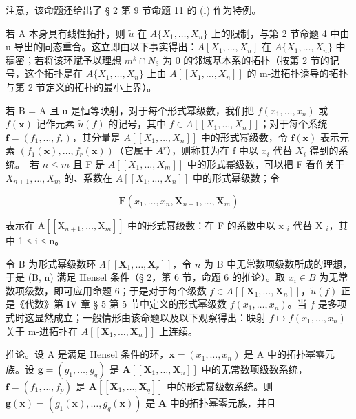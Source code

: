 注意，该命题还给出了 § 2 第 9 节命题 11 的 (i) 作为特例。

若 A 本身具有线性拓扑，则 \(\tilde{u}\) 在 \(A\{X_{1},\ldots,X_{n}\}\) 上的限制，与第 2 节命题 4 中由 u 导出的同态重合。这立即由以下事实得出：\(A[X_{1},\ldots,X_{n}]\) 在 \(A\{X_{1},\ldots,X_{n}\}\) 中稠密；若将该环赋予以理想 \(m^{k}\cap N_{3}\) 为 0 的邻域基本系的拓扑（按第 2 节的记号，这个拓扑是在 \(A\{X_{1},\ldots,X_{n}\}\) 上由 \(A[[X_{1},\ldots,X_{n}]]\) 的 m-进拓扑诱导的拓扑与第 2 节定义的拓扑的最小上界）。

若 B = A 且 u 是恒等映射，对于每个形式幂级数，我们把 \(f(x_{1}, \ldots, x_{n})\) 或 \(f(\mathbf{x})\) 记作元素 \(\tilde{u}(f)\) 的记号，其中 \(f \in A[[X_{1}, \ldots, X_{n}]]\)；对于每个系统 \(\mathbf{f} = (f_{1}, \ldots, f_{r})\)，其分量是 \(A[[X_{1}, \ldots, X_{n}]]\) 中的形式幂级数，令 \(\mathbf{f}(\mathbf{x})\) 表示元素 \((f_{1}(\mathbf{x}), \ldots, f_{r}(\mathbf{x}))\)（它属于 \(A^{r}\)），则称其为在 f 中以 \(x_{i}\) 代替 \(X_{i}\) 得到的系统。~若 \(n \leqslant m\) 且 F 是 \(A[[X_{1}, \ldots, X_{m}]]\) 中的形式幂级数，可以把 F 看作关于 \(X_{n+1}, \ldots, X_{m}\) 的、系数在 \(A[[X_{1}, \ldots, X_{n}]]\) 中的形式幂级数；令

\[
\mathbf {F} (x _ {1}, \dots , x _ {n}, \mathbf {X} _ {n + 1}, \dots , \mathbf {X} _ {m})
\]

表示在 \(\mathrm{A}[[\mathrm{X}_{n+1}, \ldots, \mathrm{X}_{m}]]\) 中的形式幂级数：在 F 的系数中以 x \(_{i}\) 代替 X \(_{i}\)，其中 1 ≤ i ≤ n。

令 B 为形式幂级数环 \(\Lambda[[\mathbf{X}_1,\ldots,\mathbf{X}_r]]\)，令 \(n\) 为 B 中无常数项级数所成的理想，于是 (B, n) 满足 Hensel 条件（§ 2，第 6 节，命题 6 的推论）。取 \(x_i \in B\) 为无常数项级数，即可应用命题 6；于是对于每个级数 \(f \in A[[\mathbf{X}_1,\ldots,\mathbf{X}_n]]\)，\(\tilde{u}(f)\) 正是《代数》第 IV 章 § 5 第 5 节中定义的形式幂级数 \(f(x_1,\ldots,x_n)\)。当 \(f\) 是多项式时这显然成立；一般情形由该命题以及以下观察得出：映射 \(f \mapsto f(x_1,\ldots,x_n)\) 关于 m-进拓扑在 \(A[[\mathbf{X}_1,\ldots,\mathbf{X}_n]]\) 上连续。

推论。设 A 是满足 Hensel 条件的环，\(\mathbf{x} = (x_{1},\ldots ,x_{n})\) 是 A 中的拓扑幂零元族。设 \(\mathbf{g} = (g_1,\dots,g_q)\) 是 \(\mathbf{A}[[\mathbf{X}_1,\ldots ,\mathbf{X}_n]]\) 中的无常数项级数系统，\(\mathbf{f} = (f_1,\dots,f_p)\) 是 \(\mathbf{A}[[\mathbf{X}_1,\dots,\mathbf{X}_q]]\) 中的形式幂级数系统。则 \(\mathbf{g}(\mathbf{x}) = (g_1(\mathbf{x}),\dots,g_q(\mathbf{x}))\) 是 \(\mathbf{A}\) 中的拓扑幂零元族，并且

